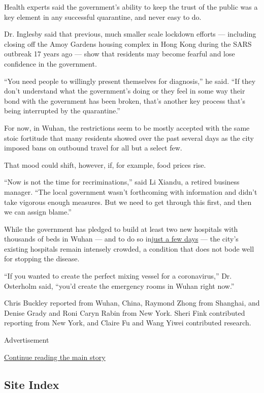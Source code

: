 Health experts said the government's ability to keep the trust of the
public was a key element in any successful quarantine, and never easy to
do.

Dr. Inglesby said that previous, much smaller scale lockdown efforts ---
including closing off the Amoy Gardens housing complex in Hong Kong
during the SARS outbreak 17 years ago --- show that residents may become
fearful and lose confidence in the government.

``You need people to willingly present themselves for diagnosis,'' he
said. ``If they don't understand what the government's doing or they
feel in some way their bond with the government has been broken, that's
another key process that's being interrupted by the quarantine.''

For now, in Wuhan, the restrictions seem to be mostly accepted with the
same stoic fortitude that many residents showed over the past several
days as the city imposed bans on outbound travel for all but a select
few.

That mood could shift, however, if, for example, food prices rise.

``Now is not the time for recriminations,'' said Li Xiandu, a retired
business manager. ``The local government wasn't forthcoming with
information and didn't take vigorous enough measures. But we need to get
through this first, and then we can assign blame.''

While the government has pledged to build at least two new hospitals
with thousands of beds in Wuhan --- and to do so
in\href{https://www.nytimes3xbfgragh.onion/2020/01/25/world/asia/china-coronavirus.html}{just
a few days} --- the city's existing hospitals remain intensely crowded,
a condition that does not bode well for stopping the disease.

``If you wanted to create the perfect mixing vessel for a coronavirus,''
Dr. Osterholm said, ``you'd create the emergency rooms in Wuhan right
now.''

Chris Buckley reported from Wuhan, China, Raymond Zhong from Shanghai,
and Denise Grady and Roni Caryn Rabin from New York. Sheri Fink
contributed reporting from New York, and Claire Fu and Wang Yiwei
contributed research.

Advertisement

\protect\hyperlink{after-bottom}{Continue reading the main story}

\hypertarget{site-index}{%
\subsection{Site Index}\label{site-index}}

